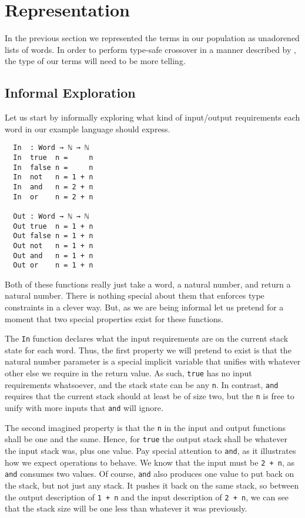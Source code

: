 \documentclass{acm_proc_article-sp}
\begin{document}
\section{Representation}

In the previous section we represented the terms in our population as
unadorened lists of words. In order to perform type-safe crossover in
a manner described by \cite{tchernev:forthcross}, the type of our
terms will need to be more telling.

\subsection{Informal Exploration}

Let us start by informally exploring what kind of input/output
requirements each word in our example language should express. 

\begin{verbatim}
  In  : Word → ℕ → ℕ
  In  true  n =     n
  In  false n =     n
  In  not   n = 1 + n
  In  and   n = 2 + n
  In  or    n = 2 + n

  Out : Word → ℕ → ℕ
  Out true  n = 1 + n
  Out false n = 1 + n
  Out not   n = 1 + n
  Out and   n = 1 + n
  Out or    n = 1 + n
\end{verbatim}

Both of these functions really just take a word, a natural number, and
return a natural number. There is nothing special about them that
enforces type constraints in a clever way. But, as we are being
informal let us pretend for a moment that two special properties exist
for these functions.

The \texttt{In} function declares what the input
requirements are on the current stack state for each word.
Thus, the first property we will pretend to exist is that the natural number
parameter is a special implicit variable that unifies with whatever
other else we require in the return value. As such, \texttt{true} has
no input requirements whatsoever, and the stack state can be any
\texttt{n}. In contrast, \texttt{and} requires that the current stack
should at least be of size two, but the \texttt{n} is free to unify
with more inputs that \texttt{and} will ignore.

The second imagined property is that the \texttt{n} in the input
and output functions shall be one and the same. Hence, for
\texttt{true} the output stack shall be whatever the input stack was,
plus one value. Pay special attention to \texttt{and}, as it
illustrates how we expect operations to behave. We know that the input
must be \texttt{2 + n}, as \texttt{and} consumes two values. Of
course, \texttt{and} also produces one value to put back on the
stack, but not just any stack. It pushes it back on the same stack, so
between the output description of \texttt{1 + n} and the input
description of \texttt{2 + n}, we can see that the stack size will be
one less than whatever it was previously.
\end{document}
